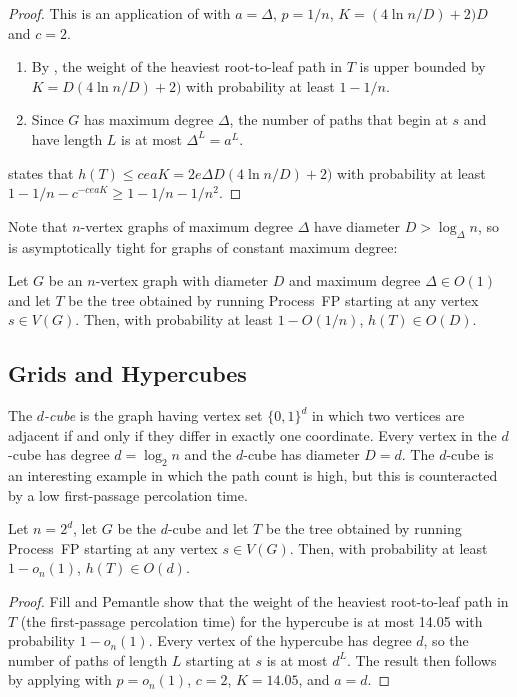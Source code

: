 \documentclass[lotsofwhite]{patmorin}
\begin{document}
\begin{proof}
  This is an application of  with $a=\Delta$, $p=1/n$,
  $K=(4\ln n/D)+2)D$ and $c=2$.
  \begin{enumerate}
     \item By , the weight of the heaviest
       root-to-leaf path in $T$ is upper bounded by $K=D(4\ln n/D)+2)$ 
       with probability
       at least $1-1/n$.
     \item Since $G$ has maximum degree $\Delta$, the number of paths
       that begin at $s$ and have length $L$ is at most $\Delta^L=a^L$.
  \end{enumerate}
   states that $h(T)\le ceaK = 2e\Delta D(4\ln n/D)+2)$ with probability at least $1-1/n-c^{-ceaK}\ge 1-1/n-1/n^2$.
\end{proof}

Note that $n$-vertex graphs of maximum degree $\Delta$ have diameter
$D>\log_\Delta n$, so  is asymptotically
tight for graphs of constant maximum degree:

\begin{cor}
  Let $G$ be an $n$-vertex graph with diameter $D$ and maximum degree
  $\Delta\in O(1)$ and let $T$ be the tree obtained by running Process~FP
  starting at any vertex $s\in V(G)$.  Then, with probability at least
  $1-O(1/n)$, $h(T)\in O(D)$.
\end{cor}

\subsection{Grids and Hypercubes}

The \emph{$d$-cube} is the graph having vertex set $\{0,1\}^d$ in
which two vertices are adjacent if and only if they differ in exactly
one coordinate.  Every vertex in the $d$-cube has degree $d=\log_2 n$
and the $d$-cube has diameter $D=d$.  The $d$-cube is an interesting
example in which the path count is high, but this is counteracted by a
low first-passage percolation time.

\begin{thm}
  Let $n=2^d$, let $G$ be the $d$-cube and let $T$ be the tree obtained
  by running Process~FP starting at any vertex $s\in V(G)$.  Then,
  with probability at least $1-o_n(1)$, $h(T)\in O(d)$.
\end{thm}

\begin{proof}
  Fill and Pemantle \cite{fill.pemantle:first} show that the weight of the 
  heaviest root-to-leaf path in $T$ (the first-passage
  percolation time) for the hypercube is at most 14.05 with probability
  $1-o_n(1)$.  Every vertex of the hypercube has degree $d$, so the number of paths of length $L$ starting at $s$ is at most
  $d^L$.  The result then follows by applying 
  with $p=o_n(1)$, $c=2$, $K=14.05$, and $a=d$.
\end{proof}
\end{document}
